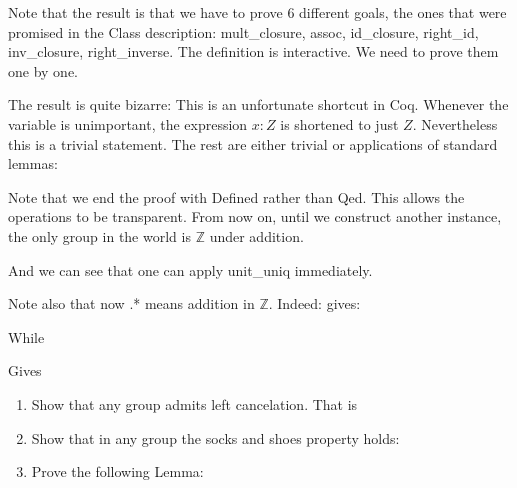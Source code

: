 Note that the result is that we have to prove 6 different goals, the ones that were promised in the Class description: mult\_closure, assoc, id\_closure,  right\_id, inv\_closure, right\_inverse. The definition is interactive. We need to prove them one by one.


The result is quite bizarre:
 This is an unfortunate shortcut in Coq. Whenever the variable is unimportant, the expression $x:Z$ is shortened to just $Z$. Nevertheless this is a trivial statement. The rest are either trivial or applications of standard lemmas:	
 
Note that we end the proof with Defined rather than Qed. This allows the operations to be transparent. From now on, until we construct another instance, the only group in the world is $\mathbb{Z}$ under addition.

And we can see that one can apply unit\_uniq immediately.

Note also that now .* means addition in $\mathbb Z$. Indeed:
gives:


While 

Gives

\begin{enumerate}
\item Show that any group admits left cancelation. That is
\item Show that in any group the socks and shoes property holds: 
\item Prove the following Lemma:

\end{enumerate}


